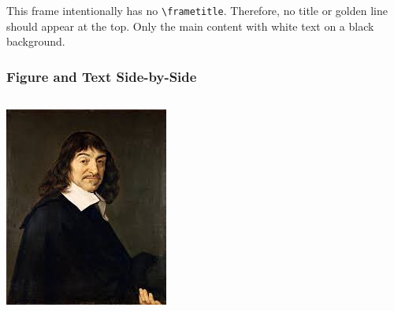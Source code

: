 \documentclass[12pt]{beamer} %
\begin{document}
	
	\begin{frame}
		This frame intentionally has no \texttt{\textbackslash frametitle}.
		Therefore, no title or golden line should appear at the top.
		Only the main content with white text on a black background.
	\end{frame}
	
	\begin{frame}
		\frametitle{Figure and Text Side-by-Side} %
		
		\begin{columns}[T] %
			
			\begin{column}{0.48\textwidth} %
				\centering %
				\includegraphics[width=\linewidth]{dikaer.jpg}
				

\end{column}
\end{columns}
\end{frame}
\end{document}
